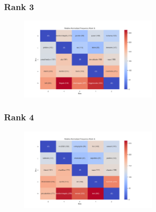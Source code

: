 \documentclass[11pt]{article}
\begin{document}
\subsubsection{Rank 3}
\begin{center}


\resizebox{\columnwidth}{!}
{
\TTRNFTable
}
\begin{figure}[h!]
  \includegraphics[width=0.6\textwidth]{figs/top_ten_rnf/rnf_t_rank_3.png}
\end{figure}
\end{center}

\pagebreak

\subsubsection{Rank 4}
\begin{center}


\resizebox{\columnwidth}{!}
{
\TTRNFTable
}
\begin{figure}[h!]
  \includegraphics[width=0.6\textwidth]{figs/top_ten_rnf/rnf_t_rank_4.png}
\end{figure}
\end{center}
\end{document}
